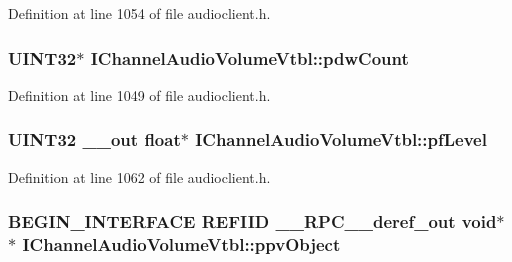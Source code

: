 Definition at line 1054 of file audioclient.\+h.

\subsubsection[{\texorpdfstring{pdw\+Count}{pdwCount}}]{ U\+I\+N\+T32$\ast$ I\+Channel\+Audio\+Volume\+Vtbl\+::pdw\+Count}\hypertarget{struct_i_channel_audio_volume_vtbl_a05e755546fa526a7a54c511276f52563}{}\label{struct_i_channel_audio_volume_vtbl_a05e755546fa526a7a54c511276f52563}


Definition at line 1049 of file audioclient.\+h.

\subsubsection[{\texorpdfstring{pf\+Level}{pfLevel}}]{ U\+I\+N\+T32 {\bf \+\_\+\+\_\+out} float$\ast$ I\+Channel\+Audio\+Volume\+Vtbl\+::pf\+Level}\hypertarget{struct_i_channel_audio_volume_vtbl_a6eae61b232e1be061f0ab818cb2800d5}{}\label{struct_i_channel_audio_volume_vtbl_a6eae61b232e1be061f0ab818cb2800d5}


Definition at line 1062 of file audioclient.\+h.

\subsubsection[{\texorpdfstring{ppv\+Object}{ppvObject}}]{\setlength{\rightskip}{0pt plus 5cm}B\+E\+G\+I\+N\+\_\+\+I\+N\+T\+E\+R\+F\+A\+CE {\bf R\+E\+F\+I\+ID} {\bf \+\_\+\+\_\+\+R\+P\+C\+\_\+\+\_\+deref\+\_\+out} {\bf void}$\ast$$\ast$ I\+Channel\+Audio\+Volume\+Vtbl\+::ppv\+Object}\hypertarget{struct_i_channel_audio_volume_vtbl_a7777be8bd394bfc3b7866128e63c17f0}{}\label{struct_i_channel_audio_volume_vtbl_a7777be8bd394bfc3b7866128e63c17f0}


